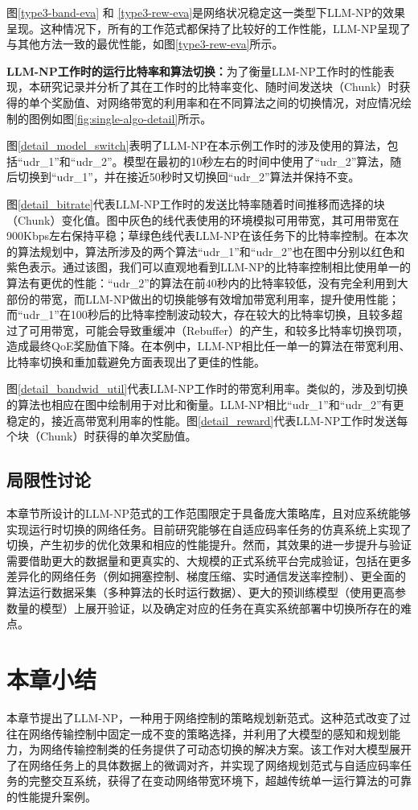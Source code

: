 图\ref{type3-band-eva} 和 \ref{type3-rew-eva}是网络状况稳定这一类型下LLM-NP的效果呈现。这种情况下，所有的工作范式都保持了比较好的工作性能，LLM-NP呈现了与其他方法一致的最优性能，如图\ref{type3-rew-eva}所示。

\textbf{LLM-NP工作时的运行比特率和算法切换：}为了衡量LLM-NP工作时的性能表现，本研究记录并分析了其在工作时的比特率变化、随时间发送块（Chunk）时获得的单个奖励值、对网络带宽的利用率和在不同算法之间的切换情况，对应情况绘制的图例如图\ref{fig:single-algo-detail}所示。



图\ref{detail_model_switch}表明了LLM-NP在本示例工作时的涉及使用的算法，包括“udr\_1”和“udr\_2”。模型在最初的10秒左右的时间中使用了“udr\_2”算法，随后切换到“udr\_1”，并在接近50秒时又切换回“udr\_2”算法并保持不变。

图\ref{detail_bitrate}代表LLM-NP工作时的发送比特率随着时间推移而选择的块（Chunk）变化值。图中灰色的线代表使用的环境模拟可用带宽，其可用带宽在900Kbps左右保持平稳；草绿色线代表LLM-NP在该任务下的比特率控制。在本次的算法规划中，算法所涉及的两个算法“udr\_1”和“udr\_2”也在图中分别以红色和紫色表示。通过该图，我们可以直观地看到LLM-NP的比特率控制相比使用单一的算法有更优的性能：“udr\_2”的算法在前40秒内的比特率较低，没有完全利用到大部份的带宽，而LLM-NP做出的切换能够有效增加带宽利用率，提升使用性能；而“udr\_1”在100秒后的比特率控制波动较大，存在较大的比特率切换，且较多超过了可用带宽，可能会导致重缓冲（Rebuffer）的产生，和较多比特率切换罚项，造成最终QoE奖励值下降。在本例中，LLM-NP相比任一单一的算法在带宽利用、比特率切换和重加载避免方面表现出了更佳的性能。

图\ref{detail_bandwid_util}代表LLM-NP工作时的带宽利用率。类似的，涉及到切换的算法也相应在图中绘制用于对比和衡量。LLM-NP相比“udr\_1”和“udr\_2”有更稳定的，接近高带宽利用率的性能。图\ref{detail_reward}代表LLM-NP工作时发送每个块（Chunk）时获得的单次奖励值。

\subsection{局限性讨论}
本章节所设计的LLM-NP范式的工作范围限定于具备庞大策略库，且对应系统能够实现运行时切换的网络任务。目前研究能够在自适应码率任务的仿真系统上实现了切换，产生初步的优化效果和相应的性能提升。然而，其效果的进一步提升与验证需要借助更大的数据量和更真实的、大规模的正式系统平台完成验证，包括在更多差异化的网络任务（例如拥塞控制、梯度压缩、实时通信发送率控制）、更全面的算法运行数据采集（多种算法的长时运行数据）、更大的预训练模型（使用更高参数量的模型）上展开验证，以及确定对应的任务在真实系统部署中切换所存在的难点。
\section{本章小结}
本章节提出了LLM-NP，一种用于网络控制的策略规划新范式。这种范式改变了过往在网络传输控制中固定一成不变的策略选择，并利用了大模型的感知和规划能力，为网络传输控制类的任务提供了可动态切换的解决方案。该工作对大模型展开了在网络任务上的具体数据上的微调对齐，并实现了网络规划范式与自适应码率任务的完整交互系统，获得了在变动网络带宽环境下，超越传统单一运行算法的可靠的性能提升案例。
